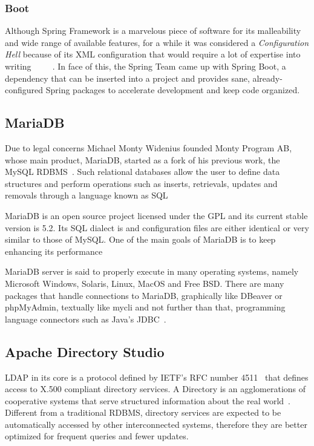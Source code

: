 \subsubsection{Boot}
Although Spring Framework is a marvelous piece of software for its malleability and wide range of available features, for a while it was considered a \textit{Configuration Hell} because of its \gls{XML} configuration that would require a lot of expertise into writing~\cite{xmlhell1}~\cite{xmlhell2}~\cite{xmlhell3}~\cite{xmlhell4}~\cite{xmlhell5}. In face of this, the Spring Team came up with Spring Boot, a dependency that can be inserted into a project and provides sane, already-configured Spring packages to accelerate development and keep code organized.

\subsection{MariaDB}
Due to legal concerns Michael Monty Widenius founded Monty Program AB, whose main product, MariaDB, started as a fork of his previous work, the MySQL \gls{RDBMS}~\cite{MAVRO:2014}. Such relational databases allow the user to define data structures and perform operations such as inserts, retrievals, updates and removals through a language known as \gls{SQL}

MariaDB is an open source project licensed under the \gls{GPL} and its current stable version is 5.2. Its \gls{SQL} dialect is and configuration files are either identical or very similar to those of MySQL. One of the main goals of MariaDB is to keep enhancing its performance~\cite{BARTHOLOMEW:2012}

MariaDB server is said to properly execute in many operating systems, namely Microsoft Windows, Solaris, Linux, MacOS and Free BSD. There are many packages that handle connections to MariaDB, graphically like DBeaver or phpMyAdmin, textually like mycli and not further than that, programming language connectors such as Java's \gls{JDBC}~\cite{MARIADB:2019}.

\subsection{Apache Directory Studio}\label{ads}
\gls{LDAP} in its core is a protocol defined by \gls{IETF}'s \gls{RFC} number 4511~\cite{ldaprfc} that defines access to X.500 compliant directory services. A Directory is an agglomerations of cooperative systems that serve structured information about the real world~\cite{x500}. Different from a traditional \gls{RDBMS}, directory services are expected to be automatically accessed by other interconnected systems, therefore they are better optimized for frequent queries and fewer updates.

